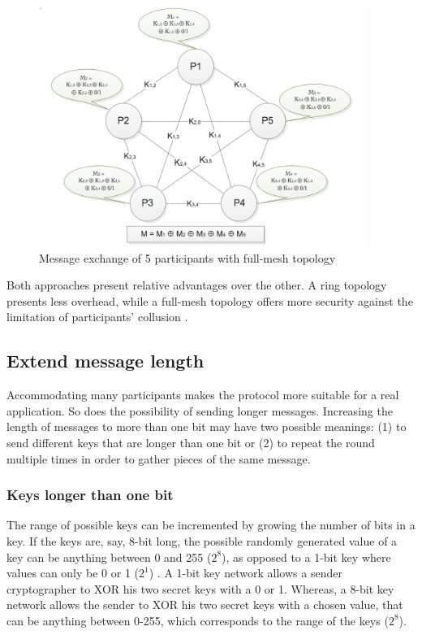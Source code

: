 \begin{figure}[h!]
    \centering
    \includegraphics[width=0.95\textwidth]{Images/nparticipants2.png}
    \caption{Message exchange of 5 participants with full-mesh topology}
    \label{fig:nparticipants2}
\end{figure}


Both approaches present relative advantages over the other. A ring topology presents less overhead, while a full-mesh topology offers more security against the limitation of participants' collusion \cite{Franck}.


\subsection{Extend message length}

Accommodating many participants makes the protocol more suitable for a real application. So does the possibility of sending longer messages. Increasing the length of messages to more than one bit may have two possible meanings: (1) to send different keys that are longer than one bit or (2) to repeat the round multiple times in order to gather pieces of the same message.

\subsubsection{Keys longer than one bit} \label{sec:longerKeys}
The range of possible keys can be incremented by growing the number of bits in a key. If the keys are, say, 8-bit long, the possible randomly generated value of a key can be anything between 0 and 255 ($2^8$), as opposed to a 1-bit key where values can only be 0 or 1 ($2^1$) \cite{Scholz}. A 1-bit key network allows a sender cryptographer to XOR his two secret keys with a 0 or 1. Whereas, a 8-bit key network allows the sender to XOR his two secret keys with a chosen value, that can be anything between 0-255, which corresponds to the range of the keys ($2^8$).

